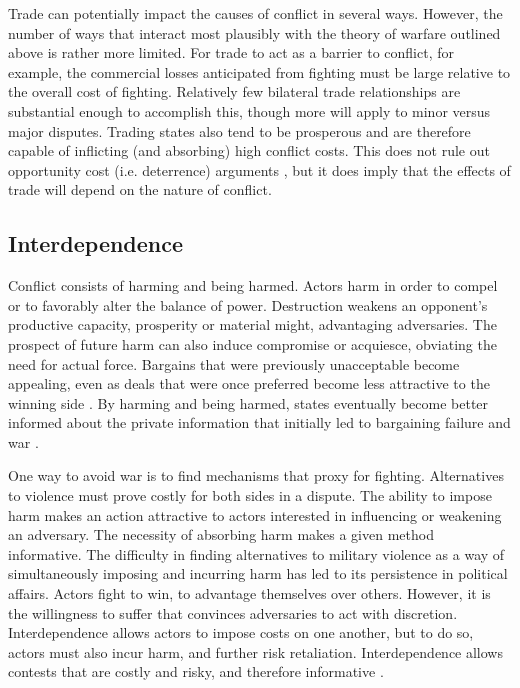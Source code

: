 \documentclass[12pt]{article}
\theoremstyle{hypothesis}
\begin{document}

Trade can potentially impact the causes of conflict in several ways.  However, the number of ways that interact most plausibly with the theory of warfare outlined above is rather more limited.  For trade to act as a barrier to conflict, for example, the commercial losses anticipated from fighting must be large relative to the overall cost of fighting.  Relatively few bilateral trade relationships are substantial enough to accomplish this, though more will apply to minor versus major disputes.  Trading states also tend to be prosperous and are therefore capable of inflicting (and absorbing) high conflict costs.  This does not rule out opportunity cost (i.e. deterrence) arguments \citep{Polachek:2010}, but it does imply that the effects of trade will depend on the nature of conflict.

\subsection*{Interdependence}

Conflict consists of harming and being harmed.  Actors harm in order to compel or to favorably alter the balance of power.  Destruction weakens an opponent's productive capacity, prosperity or material might, advantaging adversaries.  The prospect of future harm can also induce compromise or acquiesce, obviating the need for actual force.  Bargains that were previously unacceptable become appealing, even as deals that were once preferred become less attractive to the winning side \citep{Wittman:1979}.  By harming and being harmed, states eventually become better informed about the private information that initially led to bargaining failure and war \citep{Powell:2004}.

One way to avoid war is to find mechanisms that proxy for fighting.  Alternatives to violence must prove costly for both sides in a dispute.  The ability to impose harm makes an action attractive to actors interested in influencing or weakening an adversary.  The necessity of absorbing harm makes a given method informative.  The difficulty in finding alternatives to military violence as a way of simultaneously imposing and incurring harm has led to its persistence in political affairs.  Actors fight to win, to advantage themselves over others.  However, it is the willingness to suffer that convinces adversaries to act with discretion. Interdependence allows actors to impose costs on one another, but to do so, actors must also incur harm, and further risk retaliation. Interdependence allows contests that are costly and risky, and therefore informative \citep{Morrow:1999b}.
\end{document}
